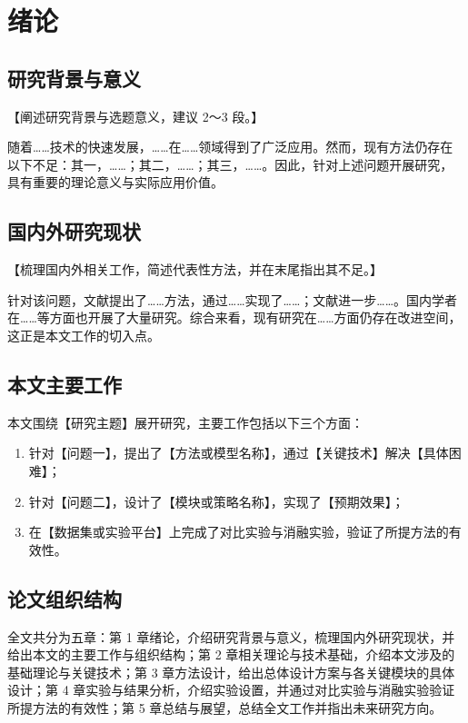 \section{绪论}

\subsection{研究背景与意义}

【阐述研究背景与选题意义，建议 2～3 段。】

随着……技术的快速发展，……在……领域得到了广泛应用。然而，现有方法仍存在以下不足：其一，……；其二，……；其三，……。因此，针对上述问题开展研究，具有重要的理论意义与实际应用价值。

\subsection{国内外研究现状}

【梳理国内外相关工作，简述代表性方法，并在末尾指出其不足。】

针对该问题，文献提出了……方法，通过……实现了……；文献进一步……。国内学者在……等方面也开展了大量研究。综合来看，现有研究在……方面仍存在改进空间，这正是本文工作的切入点。

\subsection{本文主要工作}

本文围绕【研究主题】展开研究，主要工作包括以下三个方面：

\begin{enumerate}
  \item 针对【问题一】，提出了【方法或模型名称】，通过【关键技术】解决【具体困难】；
  \item 针对【问题二】，设计了【模块或策略名称】，实现了【预期效果】；
  \item 在【数据集或实验平台】上完成了对比实验与消融实验，验证了所提方法的有效性。
\end{enumerate}

\subsection{论文组织结构}

全文共分为五章：第 1 章绪论，介绍研究背景与意义，梳理国内外研究现状，并给出本文的主要工作与组织结构；第 2 章相关理论与技术基础，介绍本文涉及的基础理论与关键技术；第 3 章方法设计，给出总体设计方案与各关键模块的具体设计；第 4 章实验与结果分析，介绍实验设置，并通过对比实验与消融实验验证所提方法的有效性；第 5 章总结与展望，总结全文工作并指出未来研究方向。
